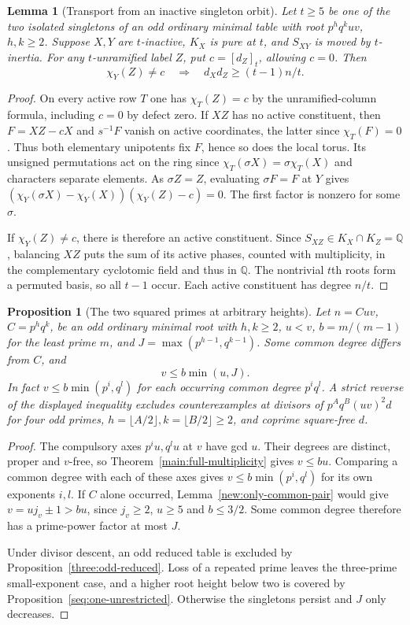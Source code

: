 \documentclass[11pt,a4paper]{article}
\numberwithin{equation}{section}
\newtheorem{proposition}[theorem]{Proposition}
\newtheorem{lemma}[theorem]{Lemma}
\theoremstyle{remark}
\begin{document}
\begin{lemma}[Transport from an inactive singleton orbit]\label{fam:M:9.10}\label{new:transport}
Let $t\ge5$ be one of the two isolated singletons of an odd ordinary minimal table with root $p^h q^k uv$, $h,k\ge2$.
Suppose $X,Y$ are $t$-inactive, $K_X$ is pure at $t$, and $S_{XY}$ is moved by $t$-inertia.
For any $t$-unramified label $Z$, put $c=[d_Z]_t$, allowing $c=0$.
Then
\[
 \chi_Y(Z)\ne c\quad\Longrightarrow\quad d_X d_Z\ge(t-1)n/t.
\]
\end{lemma}
\begin{proof}
On every active row $T$ one has $\chi_T(Z)=c$ by the unramified-column
formula, including $c=0$ by defect zero. If $XZ$ has no active
constituent, then $F=XZ-cX$ and $s^{-1}F$ vanish on active coordinates,
the latter since $\chi_T(F)=0$. Thus both elementary unipotents fix
$F$, hence so does the local torus. Its unsigned permutations act on
the ring since $\chi_T(\sigma X)=\sigma\chi_T(X)$ and characters
separate elements. As $\sigma Z=Z$, evaluating $\sigma F=F$ at $Y$
gives $(\chi_Y(\sigma X)-\chi_Y(X))(\chi_Y(Z)-c)=0$. The first
factor is nonzero for some $\sigma$.

If $\chi_Y(Z)\ne c$, there is therefore an active constituent. Since
$S_{XZ}\in K_X\cap K_Z=\mathbb Q$, balancing $XZ$ puts the sum
of its active phases, counted with multiplicity, in the complementary
cyclotomic field and thus in $\mathbb Q$. The nontrivial $t$th roots
form a permuted basis, so all $t-1$ occur. Each active constituent
has degree $n/t$.
\end{proof}

\begin{proposition}[The two squared primes at arbitrary heights]\label{main:gap-all-heights}
\label{fam:M:9.13}\label{r6:both-unrestricted}\label{both-singleton}
Let $n=Cuv$, $C=p^h q^k$, be an odd ordinary minimal root with
$h,k\ge2$, $u<v$, $b=m/(m-1)$ for the least prime $m$, and
$J=\max(p^{h-1},q^{k-1})$. Some common degree differs from $C$, and
\[
                      v\le b\min(u,J).
\]
In fact $v\le b\min(p^i,q^l)$ for each occurring common degree
$p^i q^l$. A strict reverse of the displayed inequality excludes counterexamples at
divisors of $p^Aq^B(uv)^2d$ for four odd primes,
$h=\lfloor A/2\rfloor,k=\lfloor B/2\rfloor\ge2$, and coprime square-free $d$.
\end{proposition}
\begin{proof}
The compulsory axes $p^iu,q^lu$ at $v$ have gcd $u$. Their degrees
are distinct, proper and $v$-free, so Theorem~\ref{main:full-multiplicity}
gives $v\le bu$. Comparing a common degree with each of these axes
gives $v\le b\min(p^i,q^l)$ for its own exponents $i,l$.
If $C$ alone occurred, Lemma~\ref{new:only-common-pair} would give
$v=uj_v\pm1>bu$, since $j_v\ge2$, $u\ge5$ and $b\le3/2$.
Some common degree therefore has a prime-power factor at most $J$.

Under divisor descent, an odd reduced table is excluded by
Proposition~\ref{three:odd-reduced}. Loss of a repeated prime leaves
the three-prime small-exponent case, and a higher root height below two
is covered by Proposition~\ref{seq:one-unrestricted}. Otherwise the
singletons persist and $J$ only decreases.
\end{proof}
\end{document}
